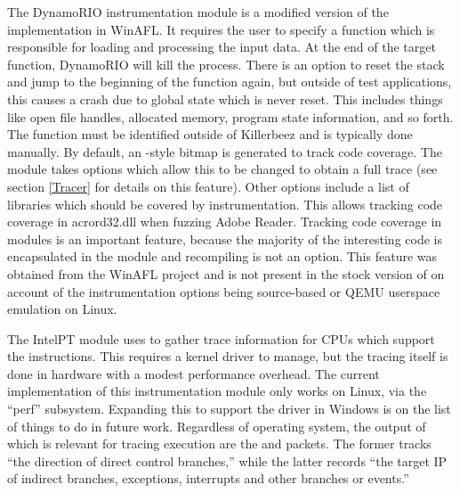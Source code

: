 The DynamoRIO instrumentation module is a modified version of the
implementation in WinAFL. It requires the user to specify a function which
is responsible for loading and processing the input data. At the end of the
target function, DynamoRIO will kill the process. There is an option to reset
the stack and jump to the beginning of the function again, but outside of test
applications, this causes a crash due to global state which is never reset.
This includes things like open file handles, allocated memory, program state
information, and so forth. The function must be identified outside of
Killerbeez and is typically done manually. By default, an \AFL{}-style bitmap
is generated to track code coverage. The module takes options which allow this
to be changed to obtain a full trace (see section \ref{Tracer} for details on
this feature). Other options include a list of libraries which should be
covered by instrumentation. This allows tracking code coverage in acrord32.dll
when fuzzing Adobe Reader.  Tracking code coverage in modules is an important
feature, because the majority of the interesting code is encapsulated in the
module and recompiling is not an option. This feature was obtained from the
WinAFL\cite{winafl} project and is not present in the stock version of \AFL{}
on account of the instrumentation options being source-based or QEMU userspace
emulation on Linux.

The IntelPT module uses \IPT{} to gather trace information for CPUs which
support the \IPT{} instructions. This requires a kernel driver to manage, but
the tracing itself is done in hardware with a modest performance overhead. The
current implementation of this instrumentation module only works on Linux, via
the ``perf'' subsystem. Expanding this to support the \IPT{} driver in Windows
is on the list of things to do in future work. Regardless of operating system,
the output of \IPT{} which is relevant for tracing execution are the \TNT{} and
\TIP{} packets.  The former tracks ``the direction of direct control branches,''
while the latter records ``the target IP of indirect branches, exceptions,
interrupts and other branches or events.''\cite{intelptmanual}

